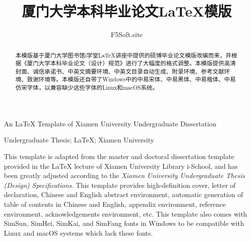 \documentclass{xmu}
\begin{document}
\title{厦门大学本科毕业论文LaTeX模版}
{An LaTeX Template of Xiamen University Undergraduate Dissertation}

\author{F5Soft.site}



\subject{计算机科学与技术}





{Undergraduate Thesis; LaTeX; Xiamen University}

\maketitle

\begin{abstract}
    本模版基于厦门大学图书馆i学堂LaTeX讲座中提供的硕博毕业论文模版\cite{xmuischool}改编而来，并根据《厦门大学本科毕业论文（设计）规范》\cite{xmuthesis}进行了大幅度的格式调整。本模版提供高清封面、诚信承诺书、中英文摘要环境、中英文目录自动生成、附录环境、参考文献环境、致谢环境等。本模版还自带了Windows中的中易宋体、中易黑体、中易楷体、中易仿宋字体，以兼容缺少这些字体的Linux和macOS系统。
\end{abstract}

\begin{enabstract}
    This template is adapted from the master and doctoral dissertation template provided in the LaTeX lecture of Xiamen University Library i-School\cite{xmuischool}, and has been greatly adjusted according to the \textit{Xiamen University Undergraduate Thesis (Design) Specifications}\cite{xmuthesis}. This template provides high-definition cover, letter of declaration, Chinese and English abstract environment, automatic generation of table of contents in Chinese and English, appendix environment, reference environment, acknowledgements environment, etc. This template also comes with SimSun, SimHei, SimKai, and SimFang fonts in Windows to be compatible with Linux and macOS systems which lack these fonts.
\end{enabstract}

\tableofcontents
\end{document}
